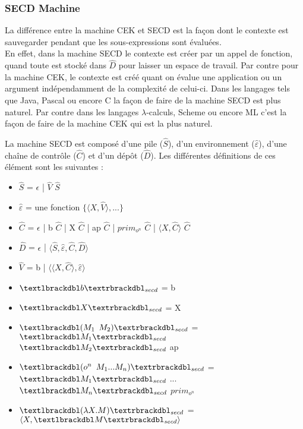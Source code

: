 \documentclass[10pt,a4paper]{article}
\begin{document}
			
			\subsubsection{SECD Machine}
			
			La différence entre la machine CEK et SECD est la façon dont le contexte est sauvegarder pendant que les sous-expressions sont évaluées.\\
			En effet, dans la machine SECD le contexte est créer par un appel de fonction, quand toute est stocké dans $\widehat{D}$ pour laisser un espace de travail. Par contre pour la machine CEK, le contexte est créé quant on évalue une application ou un argument indépendamment de la complexité de celui-ci.
			\smallbreak 
			Dans les langages tels que Java, Pascal ou encore C la façon de faire de la machine SECD est plus naturel. Par contre  dans les langages $\lambda$-calculs, Scheme ou encore ML c'est la façon de faire de la machine CEK qui est la plus naturel.
			\medbreak
			
			La machine SECD est composé d'une pile ($\widehat{S}$), d'un environnement ($\widehat{\varepsilon}$), d'une chaîne de contrôle ($\widehat{C}$) et d'un dépôt ($\widehat{D}$). Les différentes définitions de ces élément sont les suivantes :
			\smallbreak
			\begin{itemize}
				\item[] $\widehat{S}$ = $\epsilon$ | $\widehat{V}$ $\widehat{S}$ 
				\item[] $\widehat{\varepsilon}$ = une fonction $\{\langle X,\widehat{V}\rangle,...\}$
				\item[] $\widehat{C}$ = $\epsilon$ | b $\widehat{C}$ | X $\widehat{C}$ | ap $\widehat{C}$ | $prim_{o^{n}}$ $\widehat{C}$ | $\langle X,\widehat{C}\rangle$ $\widehat{C}$
				\item[] $\widehat{D}$ = $\epsilon$ | $\langle\widehat{S},\widehat{\varepsilon},\widehat{C},\widehat{D}\rangle$
				\item[] $\widehat{V}$ = b | $\langle\langle X,\widehat{C}\rangle,\widehat{\varepsilon}\rangle$
				\item[] $\textlbrackdbl b\textrbrackdbl _{secd}$ = b
				\item[] $\textlbrackdbl X\textrbrackdbl _{secd}$ = X
				\item[] $\textlbrackdbl (M_{1}$ $M_{2})\textrbrackdbl _{secd}$ = $\textlbrackdbl M_{1}\textrbrackdbl _{secd}$ $\textlbrackdbl M_{2}\textrbrackdbl _{secd}$ ap
				\item[] $\textlbrackdbl (o^{n}$ $M_{1}...M_{n})\textrbrackdbl _{secd}$ = $\textlbrackdbl M_{1}\textrbrackdbl _{secd}$ $...$ $\textlbrackdbl M_{n}\textrbrackdbl _{secd}$ $prim_{o^{n}}$
				\item[]  $\textlbrackdbl(\lambda X.M)\textrbrackdbl _{secd}$ =  $\langle X,\textlbrackdbl M\textrbrackdbl _{secd}\rangle$
			\end{itemize}
			\bigbreak
			
\end{document}
